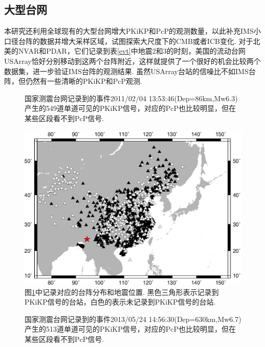 \subsection{大型台网}

本研究还利用全球现有的大型台网增大PKiKP和PcP的观测数量，以此补充IMS小口径台阵的数据并增大采样区域，试图探索大尺度下的CMB或者ICB变化. 对于北美的NVAR和PDAR，它们记录到表\ref{evt}中地震2和3的时刻，美国的流动台网USArray恰好分别移动到这两个台阵附近，这样就提供了一个很好的机会比较两个数据集，进一步验证IMS台阵的观测结果. 虽然USArray台站的信噪比不如IMS台阵，但仍然有一些清晰的PKiKP和PcP观测. 

\begin{figure}[ht]
		\centering
		\caption{国家测震台网记录到的事件2011/02/04 13:53:46(Dep=86km,Mw6.3)产生的549道单道可见的PKiKP信号，对应的PcP也比较明显，但在某些区段看不到PcP信号. }
		\label{cn_2011}
\end{figure}


\begin{figure}
\centering
\includegraphics[width=0.8\linewidth]{fig/chap2/ev_sta_2011}
\caption{图\ref{cn_2011}中记录对应的台阵分布和地震位置. 黑色三角形表示记录到PKiKP信号的台站，白色的表示未记录到PKiKP信号的台站.}
\label{fig:ev_sta_2011}
\end{figure}


\begin{figure}[ht]
		\centering
		\caption{国家测震台网记录到的事件2013/05/24 14:56:30(Dep=630km,Mw6.7)产生的513道单道可见的PKiKP信号，对应的PcP也比较明显，但在某些区段看不到PcP信号. }
		\label{cn_2013}
\end{figure}


